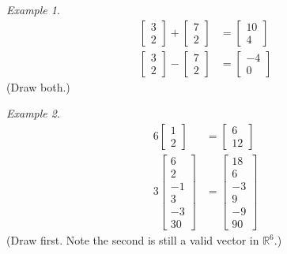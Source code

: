 \documentclass[10pt, a4paper]{amsart}
\theoremstyle{definition}
\theoremstyle{remark}
\newtheorem{ex}{Example}
\begin{document}
\begin{ex}
  \begin{align*}
    \begin{bmatrix} 3 \\ 2 \end{bmatrix} + \begin{bmatrix} 7 \\ 2 \end{bmatrix} &= \begin{bmatrix} 10 \\ 4 \end{bmatrix}\\
    \begin{bmatrix} 3 \\ 2 \end{bmatrix} - \begin{bmatrix} 7 \\ 2 \end{bmatrix} &= \begin{bmatrix} -4 \\ 0 \end{bmatrix}
  \end{align*}
  (Draw both.)
\end{ex}

\begin{ex}
  \begin{align*}
    6\begin{bmatrix} 1 \\ 2 \end{bmatrix} &= \begin{bmatrix} 6 \\ 12 \end{bmatrix}\\
    3\begin{bmatrix} 6 \\ 2 \\ -1 \\ 3 \\ -3 \\ 30 \end{bmatrix} &= \begin{bmatrix} 18 \\ 6 \\ -3 \\ 9 \\ -9 \\ 90 \end{bmatrix}
  \end{align*}
  (Draw first. Note the second is still a valid vector in $ \mathbb{R}^6 $.)
\end{ex}
\end{document}
